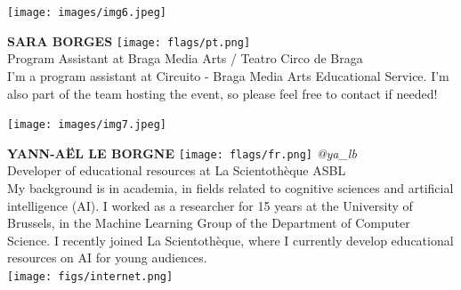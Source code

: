 \documentclass[11pt]{article}
\begin{document}
\noindent
\begin{minipage}{0.3\textwidth}
\centering
\texttt{[image: images/img6.jpeg]}
\end{minipage}
\hfill
\begin{minipage}{0.6\textwidth}\raggedright
\color{color1}\uppercase{\textbf{Sara Borges}}
\color{color2}\hspace{0.2cm}\texttt{[image: flags/pt.png]}
\\
Program Assistant at Braga Media Arts / Teatro Circo de Braga\\
{\footnotesize I'm a program assistant at Circuito - Braga Media Arts Educational Service. I'm also part of the team hosting the event, so please feel free to contact if needed! 
}\\
\end{minipage}
\newline\newline\newline

\noindent
\begin{minipage}{0.3\textwidth}
\centering
\texttt{[image: images/img7.jpeg]}
\end{minipage}
\hfill
\begin{minipage}{0.6\textwidth}\raggedright
\color{color1}\uppercase{\textbf{Yann-Aël Le Borgne}}
\color{color2}\hspace{0.2cm}\texttt{[image: flags/fr.png]}
\hspace{0.2cm}\textit{@ya\_lb}
\\
Developer of educational resources at La Scientothèque ASBL\\
{\footnotesize My background is in academia, in fields related to cognitive sciences and artificial intelligence (AI). I worked as a researcher for 15 years at the University of Brussels, in the Machine Learning Group of the Department of Computer Science. I recently joined La Scientothèque, where I currently develop educational resources on AI for young audiences.}\\
\texttt{[image: figs/internet.png]}
\end{minipage}
\newline\newline\newline
\end{document}
